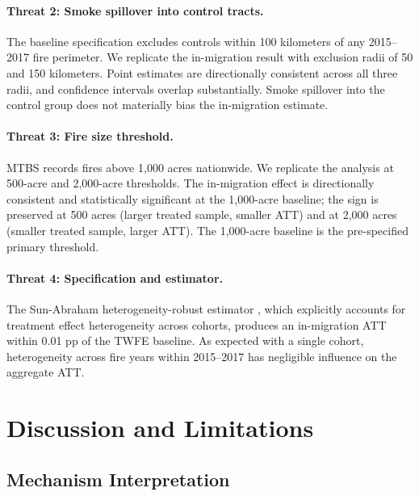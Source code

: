 \documentclass[12pt]{article}
\begin{document}
\paragraph{Threat 2: Smoke spillover into control tracts.}

The baseline specification excludes controls within 100 kilometers
of any 2015--2017 fire perimeter.
We replicate the in-migration result with exclusion radii of 50 and
150 kilometers.
Point estimates are directionally consistent across all three radii,
and confidence intervals overlap substantially.
Smoke spillover into the control group does not materially bias
the in-migration estimate.

\paragraph{Threat 3: Fire size threshold.}

MTBS records fires above 1,000 acres nationwide.
We replicate the analysis at 500-acre and 2,000-acre thresholds.
The in-migration effect is directionally consistent and
statistically significant at the 1,000-acre baseline;
the sign is preserved at 500 acres (larger treated sample, smaller ATT)
and at 2,000 acres (smaller treated sample, larger ATT).
The 1,000-acre baseline is the pre-specified primary threshold.

\paragraph{Threat 4: Specification and estimator.}

The Sun-Abraham heterogeneity-robust estimator
\citep{sun2021estimating},
which explicitly accounts for treatment effect heterogeneity
across cohorts, produces an in-migration ATT within 0.01 pp
of the TWFE baseline.
As expected with a single cohort, heterogeneity across fire years
within 2015--2017 has negligible influence on the aggregate ATT.


\section{Discussion and Limitations}
\label{sec:discussion}

\subsection{Mechanism Interpretation}
\end{document}
